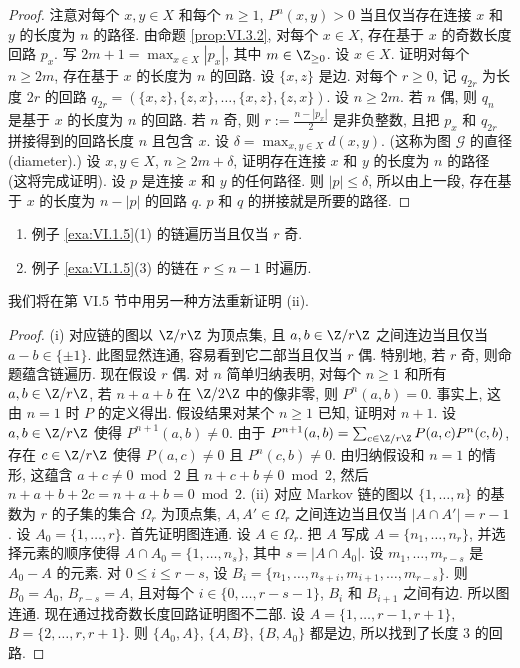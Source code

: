 \begin{proof}
注意对每个 $x, y \in X$ 和每个 $n \geq 1$, $P^n(x, y) > 0$ 当且仅当存在连接 $x$ 和 $y$ 的长度为 $n$ 的路径.
由命题 \ref{prop:VI.3.2}, 对每个 $x \in X$, 存在基于 $x$ 的奇数长度回路 $p_x$. 写 $2m + 1 = \max_{x \in X}|p_x|$, 其中 $m \in \Z_{\geq 0}$. 设 $x \in X$. 证明对每个 $n \geq 2m$, 存在基于 $x$ 的长度为 $n$ 的回路. 设 $\{x, z\}$ 是边. 对每个 $r \geq 0$, 记 $q_{2r}$ 为长度 $2r$ 的回路 $q_{2r} = (\{x, z\}, \{z, x\}, \ldots, \{x, z\}, \{z, x\})$. 设 $n \geq 2m$. 若 $n$ 偶, 则 $q_n$ 是基于 $x$ 的长度为 $n$ 的回路. 若 $n$ 奇, 则 $r := \frac{n - |p_x|}{2}$ 是非负整数, 且把 $p_x$ 和 $q_{2r}$ 拼接得到的回路长度 $n$ 且包含 $x$.
设 $\delta = \max_{x,y \in X}d(x, y)$. (这称为图 $\mathcal{G}$ 的直径 (diameter).) 设 $x, y \in X$, $n \geq 2m + \delta$, 证明存在连接 $x$ 和 $y$ 的长度为 $n$ 的路径 (这将完成证明). 设 $p$ 是连接 $x$ 和 $y$ 的任何路径. 则 $|p| \leq \delta$, 所以由上一段, 存在基于 $x$ 的长度为 $n - |p|$ 的回路 $q$. $p$ 和 $q$ 的拼接就是所要的路径.
\end{proof}

\begin{corollary}[例子中的遍历性]
\label{cor:VI.3.4}
\begin{enumerate}
\item[(i)] 例子 \ref{exa:VI.1.5}(1) 的链遍历当且仅当 $r$ 奇.
\item[(ii)] 例子 \ref{exa:VI.1.5}(3) 的链在 $r \leq n - 1$ 时遍历.
\end{enumerate}
我们将在第 VI.5 节中用另一种方法重新证明 (ii).
\end{corollary}

\begin{proof}
(i) 对应链的图以 $\Z/r\Z$ 为顶点集, 且 $a, b \in \Z/r\Z$ 之间连边当且仅当 $a - b \in \{\pm 1\}$. 此图显然连通, 容易看到它二部当且仅当 $r$ 偶. 特别地, 若 $r$ 奇, 则命题蕴含链遍历.
现在假设 $r$ 偶. 对 $n$ 简单归纳表明, 对每个 $n \geq 1$ 和所有 $a, b \in \Z/r\Z$, 若 $n + a + b$ 在 $\Z/2\Z$ 中的像非零, 则 $P^n(a, b) = 0$. 事实上, 这由 $n = 1$ 时 $P$ 的定义得出. 假设结果对某个 $n \geq 1$ 已知, 证明对 $n + 1$. 设 $a, b \in \Z/r\Z$ 使得 $P^{n+1}(a, b) \neq 0$. 由于 $P^{n+1}(a, b) = \sum_{c \in \Z/r\Z}P(a, c)P^n(c, b)$, 存在 $c \in \Z/r\Z$ 使得 $P(a, c) \neq 0$ 且 $P^n(c, b) \neq 0$. 由归纳假设和 $n = 1$ 的情形, 这蕴含 $a + c \neq 0 \bmod 2$ 且 $n + c + b \neq 0 \bmod 2$, 然后 $n + a + b + 2c = n + a + b = 0 \bmod 2$.
(ii) 对应 Markov 链的图以 $\{1, \ldots, n\}$ 的基数为 $r$ 的子集的集合 $\Omega_r$ 为顶点集, $A, A' \in \Omega_r$ 之间连边当且仅当 $|A \cap A'| = r - 1$. 设 $A_0 = \{1, \ldots, r\}$. 首先证明图连通. 设 $A \in \Omega_r$. 把 $A$ 写成 $A = \{n_1, \ldots, n_r\}$, 并选择元素的顺序使得 $A \cap A_0 = \{1, \ldots, n_s\}$, 其中 $s = |A \cap A_0|$. 设 $m_1, \ldots, m_{r-s}$ 是 $A_0 - A$ 的元素. 对 $0 \leq i \leq r - s$, 设 $B_i = \{n_1, \ldots, n_{s+i}, m_{i+1}, \ldots, m_{r-s}\}$. 则 $B_0 = A_0$, $B_{r-s} = A$, 且对每个 $i \in \{0, \ldots, r - s - 1\}$, $B_i$ 和 $B_{i+1}$ 之间有边. 所以图连通.
现在通过找奇数长度回路证明图不二部. 设 $A = \{1, \ldots, r - 1, r + 1\}$, $B = \{2, \ldots, r, r + 1\}$. 则 $\{A_0, A\}$, $\{A, B\}$, $\{B, A_0\}$ 都是边, 所以找到了长度 $3$ 的回路.
\end{proof}


